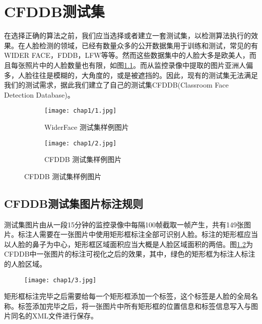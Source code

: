 \chapter{CFDDB测试集}
\label{chap:establishCFDDB}

在选择正确的算法之前，我们应当选择或者建立一套测试集，以检测算法执行的效果。在人脸检测的领域，已经有数量众多的公开数据集用于训练和测试，常见的有WIDER FACE\cite{yang2016wider}，FDDB\cite{fddbTech}，LFW\cite{huang2007labeled}等等。然而这些数据集中的人脸大多是欧美人，而且每张照片中的人脸数量也有限，如图\ref{fig:chap1:pic}。而从监控录像中提取的图片亚洲人偏多，人脸往往是模糊的，大角度的，或是被遮挡的。因此，现有的测试集无法满足我们的测试需求，据此我们建立了自己的测试集CFDDB(Classroom Face Detection Database)。


\begin{figure}[!htp]
	\centering
	\begin{subfigure}{6cm}
		\centering
		\texttt{[image: chap1/1.jpg]}
		\caption{WiderFace 测试集样例图片}
	\end{subfigure}
	\hspace{4em}
	\begin{subfigure}{6cm}
		\centering
		\texttt{[image: chap1/2.jpg]}
		\caption{CFDDB 测试集样例图片}
	\end{subfigure}
	\label{fig:chap1:pic}
\end{figure}


\section{CFDDB测试集图片标注规则}

测试集图片由从一段15分钟的监控录像中每隔100帧截取一帧产生，共有149张图片。标注人需要在一张图片中使用矩形框标注全部可识别人脸。标注的矩形框应当以人脸的鼻子为中心，矩形框区域面积应当大概是人脸区域面积的两倍。图\ref{fig:chap1:cfddblbexp}为CFDDB中一张图片的标注可视化之后的效果，其中，绿色的矩形框为标注人标注的人脸区域。

\begin{figure}[!htp]
	\centering
	\texttt{[image: chap1/3.jpg]}
	\label{fig:chap1:cfddblbexp}
\end{figure}

矩形框标注完毕之后需要给每一个矩形框添加一个标签，这个标签是人脸的全局名称。标签添加完毕之后，将一张图片中所有矩形框的位置信息和标签信息写入与图片同名的XML文件进行保存。

